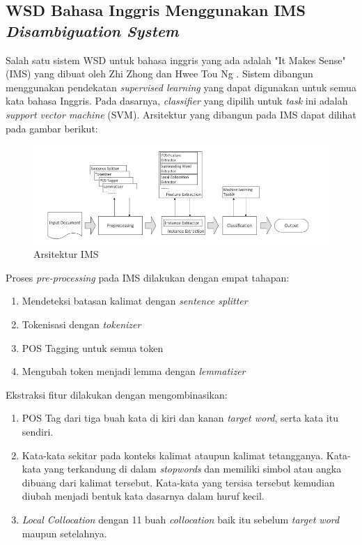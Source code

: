 \subsection{WSD Bahasa Inggris Menggunakan IMS \textit{Disambiguation System}}
Salah satu sistem WSD untuk bahasa inggris yang ada adalah "It Makes Sense" (IMS) yang dibuat oleh Zhi Zhong dan Hwee Tou Ng \citep{zhong2010makes}. Sistem  dibangun menggunakan pendekatan \textit{supervised learning} yang dapat digunakan untuk semua kata bahasa Inggris. Pada dasarnya, \textit{classifier} yang dipilih untuk \textit{task} ini adalah \textit{support vector machine} (SVM). Arsitektur yang dibangun pada IMS dapat dilihat pada gambar berikut:

\begin{figure}
	\centering
	\includegraphics[width=1\linewidth]{adit_pics/Arsitektur-IMS}
	\caption{Arsitektur IMS}
	\label{fig:Arsitektur-IMS}
\end{figure}

Proses \textit{pre-processing} pada IMS dilakukan dengan empat tahapan:
\begin{enumerate}
	\item Mendeteksi batasan kalimat dengan \textit{sentence splitter}
	\item Tokenisasi dengan \textit{tokenizer}
	\item POS Tagging untuk semua token
	\item Mengubah token menjadi lemma dengan \textit{lemmatizer}
\end{enumerate}

Ekstraksi fitur dilakukan dengan mengombinasikan:

\begin{enumerate}
	\item POS Tag dari tiga buah kata di kiri dan kanan \textit{target word}, serta kata itu sendiri. 
	\item Kata-kata sekitar pada konteks kalimat ataupun kalimat tetangganya. Kata-kata yang terkandung di dalam \textit{stopwords} dan memiliki simbol atau angka dibuang dari kalimat tersebut. Kata-kata yang tersisa tersebut kemudian diubah menjadi bentuk kata dasarnya dalam huruf kecil.
	\item \textit{Local Collocation} dengan 11 buah \textit{collocation} baik itu sebelum \textit{target word} maupun setelahnya. 
\end{enumerate}

